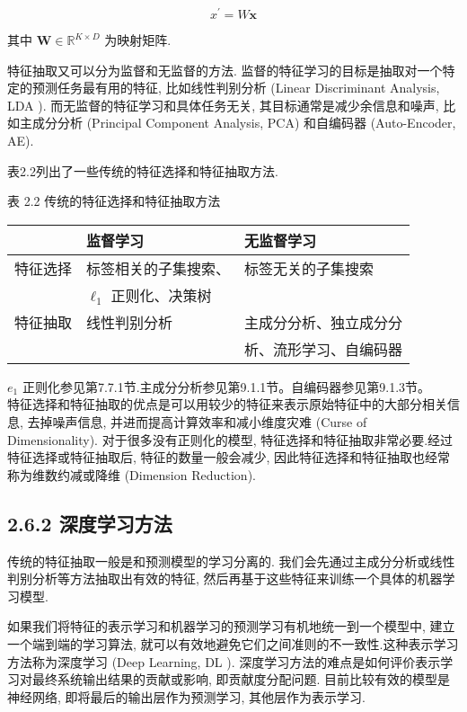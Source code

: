 \documentclass[10pt]{article}
\begin{document}
\begin{equation*}
x^{\prime}=W \boldsymbol{x} \tag{2.72}
\end{equation*}


其中 $\boldsymbol{W} \in \mathbb{R}^{K \times D}$ 为映射矩阵.

特征抽取又可以分为监督和无监督的方法. 监督的特征学习的目标是抽取对一个特定的预测任务最有用的特征, 比如线性判别分析 (Linear Discriminant Analysis, LDA ). 而无监督的特征学习和具体任务无关, 其目标通常是减少余信息和噪声, 比如主成分分析 (Principal Component Analysis, PCA) 和自编码器 (Auto-Encoder, AE).

表2.2列出了一些传统的特征选择和特征抽取方法.

表 2.2 传统的特征选择和特征抽取方法

\begin{center}
\begin{tabular}{lll}
\hline
 & 监督学习 & 无监督学习 \\
\hline
特征选择 & 标签相关的子集搜索、 & 标签无关的子集搜索 \\
 & $\ell_{1}$ 正则化、决策树 &  \\
特征抽取 & 线性判别分析 & 主成分分析、独立成分分 \\
 &  & 析、流形学习、自编码器 \\
\end{tabular}
\end{center}

$e_{1}$ 正则化参见第7.7.1节.主成分分析参见第9.1.1节。自编码器参见第9.1.3节。\\
特征选择和特征抽取的优点是可以用较少的特征来表示原始特征中的大部分相关信息, 去掉噪声信息, 并进而提高计算效率和减小维度灾难 (Curse of Dimensionality). 对于很多没有正则化的模型, 特征选择和特征抽取非常必要.经过特征选择或特征抽取后, 特征的数量一般会减少, 因此特征选择和特征抽取也经常称为维数约减或降维 (Dimension Reduction).

\subsection*{2.6.2 深度学习方法}
传统的特征抽取一般是和预测模型的学习分离的. 我们会先通过主成分分析或线性判别分析等方法抽取出有效的特征, 然后再基于这些特征来训练一个具体的机器学习模型.

如果我们将特征的表示学习和机器学习的预测学习有机地统一到一个模型中, 建立一个端到端的学习算法, 就可以有效地避免它们之间准则的不一致性.这种表示学习方法称为深度学习 (Deep Learning, DL ). 深度学习方法的难点是如何评价表示学习对最终系统输出结果的贡献或影响, 即贡献度分配问题. 目前比较有效的模型是神经网络, 即将最后的输出层作为预测学习, 其他层作为表示学习.
\end{document}
